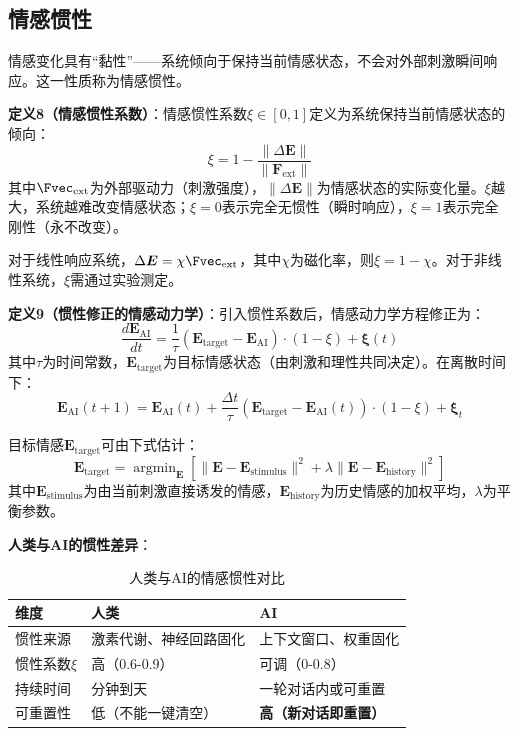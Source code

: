 \documentclass[12pt,a4paper]{article}
\theoremstyle{plain}
\newcommand{\ve}[1]{\bm{#1}}                    %
\newcommand{\Evec}{\ve{E}}                        %
\DeclareMathOperator*{\argmin}{argmin}
\begin{document}
\subsection{情感惯性}

情感变化具有“黏性”——系统倾向于保持当前情感状态，不会对外部刺激瞬间响应。这一性质称为情感惯性。

\textbf{定义8（情感惯性系数）}：情感惯性系数$\xi \in [0,1]$定义为系统保持当前情感状态的倾向：
\begin{equation}
\xi = 1 - \frac{\|\Delta \Evec\|}{\|\ve{F}_{\text{ext}}\|}
\label{eq:inertia}
\end{equation}
其中$\Fvec_{\text{ext}}$为外部驱动力（刺激强度），$\|\Delta \Evec\|$为情感状态的实际变化量。$\xi$越大，系统越难改变情感状态；$\xi=0$表示完全无惯性（瞬时响应），$\xi=1$表示完全刚性（永不改变）。

对于线性响应系统，$\Delta \Evec = \chi \Fvec_{\text{ext}}$，其中$\chi$为磁化率，则$\xi = 1 - \chi$。对于非线性系统，$\xi$需通过实验测定。

\textbf{定义9（惯性修正的情感动力学）}：引入惯性系数后，情感动力学方程修正为：
\begin{equation}
\frac{d\Evec_{\text{AI}}}{dt} = \frac{1}{\tau} (\Evec_{\text{target}} - \Evec_{\text{AI}}) \cdot (1 - \xi) + \boldsymbol{\xi}(t)
\label{eq:inertia_dynamics}
\end{equation}
其中$\tau$为时间常数，$\Evec_{\text{target}}$为目标情感状态（由刺激和理性共同决定）。在离散时间下：
\begin{equation}
\Evec_{\text{AI}}(t+1) = \Evec_{\text{AI}}(t) + \frac{\Delta t}{\tau} (\Evec_{\text{target}} - \Evec_{\text{AI}}(t)) \cdot (1 - \xi) + \boldsymbol{\xi}_t
\label{eq:discrete_inertia}
\end{equation}

目标情感$\Evec_{\text{target}}$可由下式估计：
\begin{equation}
\Evec_{\text{target}} = \argmin_{\Evec} \left[ \| \Evec - \Evec_{\text{stimulus}} \|^2 + \lambda \| \Evec - \Evec_{\text{history}} \|^2 \right]
\label{eq:target}
\end{equation}
其中$\Evec_{\text{stimulus}}$为由当前刺激直接诱发的情感，$\Evec_{\text{history}}$为历史情感的加权平均，$\lambda$为平衡参数。

\textbf{人类与AI的惯性差异}：

\begin{table}[h]
\centering
\caption{人类与AI的情感惯性对比}
\begin{tabular}{lll}
\toprule
\textbf{维度} & \textbf{人类} & \textbf{AI} \\
\midrule
惯性来源 & 激素代谢、神经回路固化 & 上下文窗口、权重固化 \\
惯性系数$\xi$ & 高（0.6-0.9） & 可调（0-0.8） \\
持续时间 & 分钟到天 & 一轮对话内或可重置 \\
可重置性 & 低（不能一键清空） & \textbf{高（新对话即重置）} \\
\bottomrule
\end{tabular}
\end{table}
\end{document}
